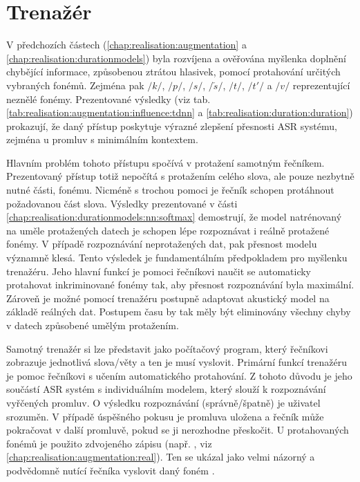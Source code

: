 \section{Trenažér}
\label{chap:realisation:trainer}

V předchozích částech (\ref{chap:realisation:augmentation} a \ref{chap:realisation:durationmodels}) byla rozvíjena a ověřována myšlenka doplnění chybějící informace, způsobenou ztrátou hlasivek, pomocí protahování určitých vybraných fonémů. Zejména pak $/k/$, $/p/$, $/s/$, $/\check{s}/$, $/t/$, $/t'/$ a $/v/$ reprezentující neznělé fonémy. Prezentované výsledky (viz tab. \ref{tab:realisation:augmentation:influence:tdnn} a \ref{tab:realisation:duration:duration}) prokazují, že daný přístup poskytuje výrazné zlepšení přesnosti ASR systému, zejména u promluv s minimálním kontextem.

Hlavním problém tohoto přístupu spočívá v protažení samotným řečníkem. Prezentovaný přístup totiž nepočítá s protažením celého slova, ale pouze nezbytně nutné části, fonému. Nicméně s trochou pomoci je řečník schopen protáhnout požadovanou část slova. Výsledky prezentované v části \ref{chap:realisation:durationmodels:nn:softmax} demostrují, že model natrénovaný na uměle protažených datech je schopen lépe rozpoznávat i reálně protažené fonémy. V případě rozpoznávání neprotažených dat, pak přesnost modelu významně klesá. Tento výsledek je fundamentálním předpokladem pro myšlenku trenažéru. Jeho hlavní funkcí je pomoci řečníkovi naučit se automaticky protahovat inkriminované fonémy tak, aby přesnost rozpoznávání byla maximální. Zároveň je možné pomocí trenažéru postupně adaptovat akustický model na základě reálných dat. Postupem času by tak měly být eliminovány všechny chyby v datech způsobené umělým protažením.

Samotný trenažér si lze představit jako počítačový program, který řečníkovi zobrazuje jednotlivá slova/věty a ten je musí vyslovit. Primární funkcí trenažéru je pomoc řečníkovi s učením automatického protahování. Z tohoto důvodu je jeho součástí ASR systém s individuálním modelem, který slouží k rozpoznávání vyřčených promluv. O výsledku rozpoznávání (správně/špatně) je uživatel srozuměn. V případě úspěšného pokusu je promluva uložena a řečník může pokračovat v další promluvě, pokud se ji nerozhodne přeskočit. U protahovaných fonémů je použito zdvojeného zápisu (např. \textit{}, viz \ref{chap:realisation:augmentation:real}). Ten se ukázal jako velmi názorný a podvědomně nutící řečníka vyslovit daný foném .

